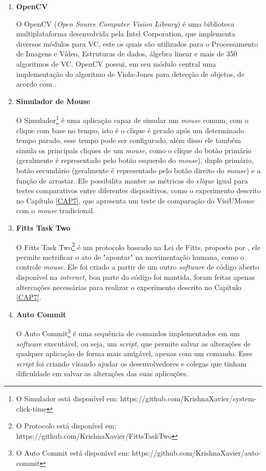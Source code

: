 \begin{enumerate}
\item \textbf{OpenCV}

O OpenCV (\textit{Open Source Computer Vision Library}) é uma biblioteca multiplataforma desenvolvida pela Intel Corporation, que implementa diversos módulos para VC, este os quais são utilizados para o Processamento de Imagens e Vídeo, Estruturas de dados, álgebra linear e mais de 350 algoritmos de VC. OpenCV possui, em seu módulo central uma implementação do algoritmo de Viola-Jones para detecção de objetos, de acordo com \cite{bradski2008learning}.

\item \textbf{Simulador de Mouse}

O Simulador\footnote{O Simulador está disponível em: https://github.com/KrishnaXavier/system-click-time} é uma aplicação capaz de simular um \textit{mouse} comum, com o clique com base no tempo, isto é o clique é gerado após um determinado tempo parado, esse tempo pode ser configurado, além disso ele também simula os principais cliques de um \textit{mouse}, como o clique do botão primário (geralmente é representado pelo botão esquerdo do \textit{mouse}), duplo primário, botão secundário (geralmente é representado pelo botão direito do \textit{mouse}) e a função de arrastar. Ele possibilita manter as métricas do \textit{clique} igual para testes comparativos entre diferentes dispositivos, como o experimento descrito no Capítulo \ref{CAP7}, que apresenta um teste de comparação do VisiUMouse com o \textit{mouse} tradicional.

\item \textbf{Fitts Task Two}

O Fitts Task Two\footnote{O Protocolo está disponível em: https://github.com/KrishnaXavier/FittsTaskTwo} é um protocolo baseado na Lei de Fitts, proposto por , ele permite metrificar o ato de "apontar" na movimentação humana, como o controle \textit{mouse}. Ele foi criado a partir de um outro \textit{software} de código aberto disponível na \textit{internet}, boa parte do código foi mantida, foram feitas apenas altercações necessárias para realizar o experimento descrito no Capítulo \ref{CAP7}.

\item \textbf{Auto Commit}

O Auto Commit\footnote{O Auto Commit está disponível em: https://github.com/KrishnaXavier/auto-commit} é uma sequência de comandos implementados em um \textit{software} executável, ou seja, um \textit{script}, que permite salvar as alterações de qualquer aplicação de forma mais amigável, apenas com um comando. Esse \textit{script} foi criando visando ajudar os desenvolvedores e colegas que tinham dificuldade em salvar as alterações das suas aplicações.


\end{enumerate}

